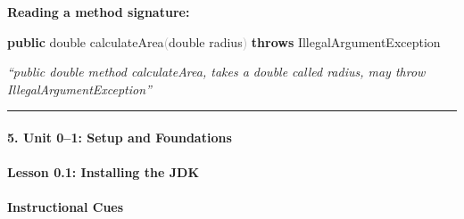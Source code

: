 \documentclass[
  justified,
  openright,
]{tufte-book}
\let\subsection\paragraph
\let\paragraph\paragraph
\newcommand{\KeywordTok}[1]{\textcolor{CodeKeyword}{\textbf{#1}}}  %
\newcommand{\CodeFuncTok}[1]{\textcolor{CodeKeyword}{#1}}           %
\newcommand{\CodeTypeTok}[1]{\textcolor{CodeType}{#1}}              %
\newcommand{\OperatorTok}[1]{\textcolor{DarkGray}{#1}}              %
\newenvironment{Shaded}{%
  \begin{mdframed}[style=TufteCode]%
}{%
  \end{mdframed}%
}
\let\subsection\paragraph
\let\paragraph\paragraph
\begin{document}
\textbf{Reading a method signature:}

\begin{Shaded}
\begin{Highlighting}[]
\KeywordTok{public} \CodeTypeTok{double} \CodeFuncTok{calculateArea}\OperatorTok{(}\CodeTypeTok{double} radius\OperatorTok{)} \KeywordTok{throws} IllegalArgumentException
\end{Highlighting}
\end{Shaded}

\emph{``public double method calculateArea, takes a double called
radius, may throw IllegalArgumentException''}

\begin{center}\rule{0.5\linewidth}{0.5pt}\end{center}

\subsection{5. Unit 0--1: Setup and
Foundations}\label{unit-01-setup-and-foundations-1}

\subsection{Lesson 0.1: Installing the
JDK}\label{lesson-0.1-installing-the-jdk}

\paragraph{Instructional Cues}\label{instructional-cues-21}
\end{document}
